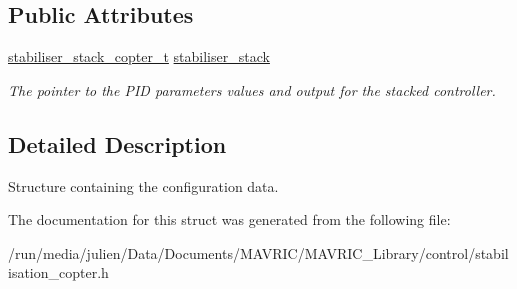 \subsection*{Public Attributes}
\begin{DoxyCompactItemize}
\item 
\hypertarget{structstabilise__copter__conf__t_ab24c4ce14de5f45aeb57b987e4a64010}{\hyperlink{structstabiliser__stack__copter__t}{stabiliser\+\_\+stack\+\_\+copter\+\_\+t} \hyperlink{structstabilise__copter__conf__t_ab24c4ce14de5f45aeb57b987e4a64010}{stabiliser\+\_\+stack}}\label{structstabilise__copter__conf__t_ab24c4ce14de5f45aeb57b987e4a64010}

\begin{DoxyCompactList}\small\item\em The pointer to the P\+I\+D parameters values and output for the stacked controller. \end{DoxyCompactList}\end{DoxyCompactItemize}


\subsection{Detailed Description}
Structure containing the configuration data. 

The documentation for this struct was generated from the following file\+:\begin{DoxyCompactItemize}
\item 
/run/media/julien/\+Data/\+Documents/\+M\+A\+V\+R\+I\+C/\+M\+A\+V\+R\+I\+C\+\_\+\+Library/control/stabilisation\+\_\+copter.\+h\end{DoxyCompactItemize}
